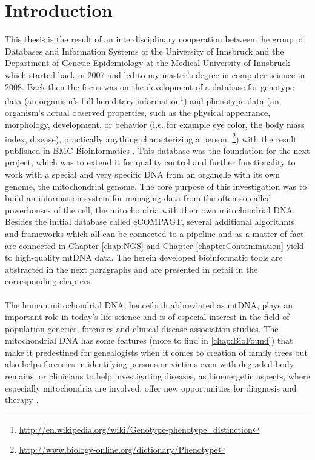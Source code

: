 \chapter{Introduction}
\label{chapterIntro}
This thesis is the result of an interdisciplinary cooperation between the group of Databases and Information Systems of the University of Innsbruck and the Department of Genetic Epidemiology at the Medical University of Innsbruck which started back in 2007 and led to my master's degree in computer science in 2008. Back then the focus was on the development of a database for genotype data (an organism's full hereditary information\footnote{\url{http://en.wikipedia.org/wiki/Genotype-phenotype\_distinction}}) and phenotype data (an organism's actual observed properties, such as the physical appearance, morphology, development, or behavior (i.e. for example eye color, the body mass index, disease), practically anything characterizing a person. \footnote{\url{http://www.biology-online.org/dictionary/Phenotype}}) with the result published in BMC Bioinformatics \cite{Schoenherr2009}. This database was the foundation for the next project, which was to extend it for quality control and further functionality to work with a special and very specific DNA from an organelle with its own genome, the mitochondrial genome. The core purpose of this investigation was to build an information system for managing data from the often so called powerhouses of the cell, the mitochondria with their own mitochondrial DNA. Besides the initial database called eCOMPAGT, several additional algorithms and frameworks which all can be connected to a pipeline and as a matter of fact are connected in Chapter \ref{chap:NGS} and Chapter \ref{chapterContamination} yield to high-quality mtDNA data. The herein developed bioinformatic tools are abstracted in the next paragraphs and are presented in detail in the corresponding chapters.
\\
\\
The human mitochondrial DNA, henceforth abbreviated as mtDNA, plays an important role in today's life-science and is of especial interest in the field of population genetics, forensics and clinical disease association studies. The mitochondrial DNA has some features (more to find in \ref{chap:BioFound}) that make it predestined for genealogists when it comes to creation of family trees but also helps forensics in identifying persons or victims even with degraded body remains, or clinicians to help investigating diseases, as bioenergetic aspects, where especially mitochondria are involved, offer new opportunities for diagnosis and therapy \cite{Picard2016}.
